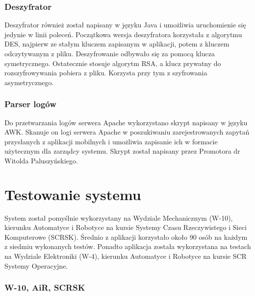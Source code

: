 \documentclass{report}
\begin{document}
			\subsection{Deszyfrator}
			Deszyfrator również został napisany w języku Java i umożliwia uruchomienie się jedynie w linii poleceń. Początkowa wersja deszyfratora korzystała z algorytmu DES, najpierw ze stałym kluczem zapisanym w aplikacji, potem z kluczem odczytywanym z pliku. Deszyfrowanie odbywało się za pomocą klucza symetrycznego. Ostatecznie stosuje algorytm RSA, a klucz prywatny do rozszyfrowywania pobiera z pliku. Korzysta przy tym z szyfrowania asymetrycznego.
			
			\subsection{Parser logów}
			Do przetwarzania logów serwera Apache wykorzystano skrypt napisany w języku AWK. Skanuje on logi serwera Apache w poszukiwaniu zarejestrowanych zapytań przysłanych z aplikacji mobilnych i umożliwia zapisanie ich w formacie użytecznym dla zarządcy systemu. Skrypt został napisany przez Promotora dr Witolda Paluszyńskiego.
			

	\chapter{Testowanie systemu}
	
	System został pomyślnie wykorzystany na Wydziale Mechanicznym (W-10), kierunku Automatyce i Robotyce na kursie Systemy Czasu Rzeczywistego i Sieci Komputerowe (SCRSK). Średnio z aplikacji korzystało około 90 osób na każdym z siedmiu wykonanych testów. Ponadto aplikacja została wykorzystana na testach na Wydziale Elektroniki (W-4), kierunku Automatyce i Robotyce na kursie SCR Systemy Operacyjne.

		\subsection{W-10, AiR, SCRSK}
		
\end{document}
